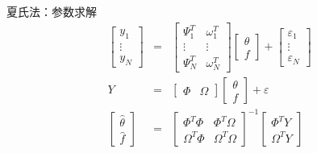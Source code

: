 \begin{frame}{夏氏法：参数求解}
\begin{eqnarray*}
\begin{bmatrix} y_1 \\ \vdots \\ y_{N} \end{bmatrix}&=& 
\begin{bmatrix} \Psi_1^T & \omega_1^T  \\
\vdots & \vdots \\
\Psi_N^T & \omega_N^T
\end{bmatrix} \begin{bmatrix}\theta \\ f \end{bmatrix} + 
\begin{bmatrix} \varepsilon_1 \\ \vdots \\ \varepsilon_N \end{bmatrix}\\
Y &=& \begin{bmatrix} \Phi & \Omega \end{bmatrix} \begin{bmatrix}\theta \\ f \end{bmatrix} + \varepsilon \\
\begin{bmatrix}\hat\theta \\ \hat f \end{bmatrix} &=& \begin{bmatrix}\Phi^T\Phi & \Phi^T\Omega \\ \Omega^T\Phi & \Omega^T\Omega \end{bmatrix}^{-1}\begin{bmatrix}\Phi^T Y \\ \Omega^T Y\end{bmatrix}
\end{eqnarray*}
\end{frame}


